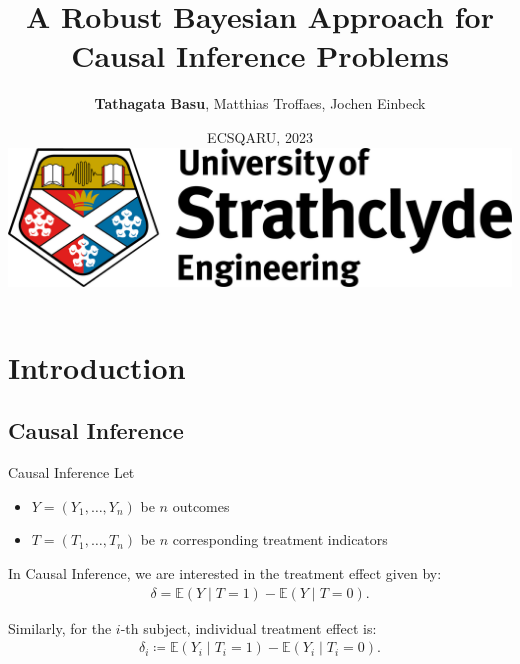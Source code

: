 \documentclass[aspectratio=169]{beamer}					%
\title[]{A Robust Bayesian Approach for Causal Inference Problems}%
\author[]{\textbf{Tathagata Basu}, Matthias Troffaes, Jochen Einbeck}								%
\date{ECSQARU, 2023\\

\vspace{2em}
\includegraphics[width = 0.3\linewidth]{strath_engineering.jpg}}
\begin{document}
\begin{frame}
  \titlepage
\end{frame}

\section{Introduction}

\subsection{Causal Inference}

\begin{frame}{Causal Inference}
Let
\begin{itemize}
    \item $Y=(Y_1, \dots, Y_n)$ be $n$ outcomes
    \item $T=(T_1, \dots, T_n)$ be $n$ corresponding treatment indicators
\end{itemize}

In \alert{Causal Inference}, we are interested in the
\alert{treatment effect} given by: 
\begin{align}
	\delta = \mathbb{E}(Y\mid T =1) - \mathbb{E}(Y\mid T=0).
\end{align}
\pause

Similarly, for the $i$-th subject, \alert{individual treatment effect} is:
\begin{align}
	\delta_i \coloneqq \mathbb{E}(Y_i\mid T_i=1) - \mathbb{E}(Y_i\mid T_i=0).
\end{align}
\end{frame}

\end{document}
